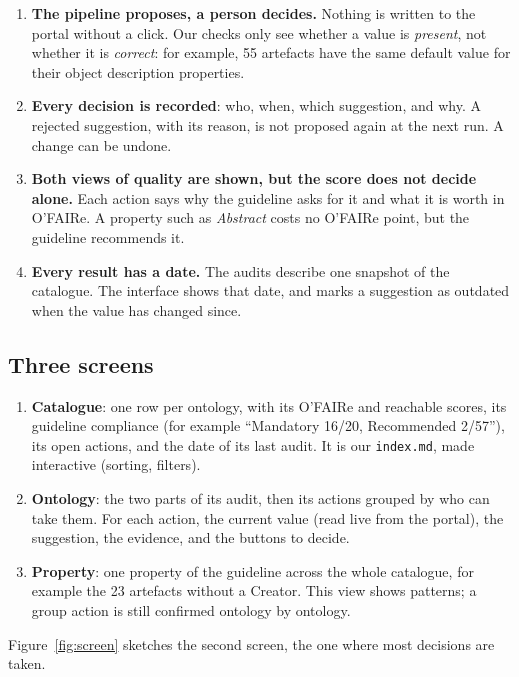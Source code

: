 \documentclass[11pt,a4paper]{article}
\begin{document}
\begin{enumerate}
  \item \textbf{The pipeline proposes, a person decides.} Nothing is written to the portal without a
    click. Our checks only see whether a value is \emph{present}, not whether it is \emph{correct}: for
    example, 55 artefacts have the same default value for their object description properties.
  \item \textbf{Every decision is recorded}: who, when, which suggestion, and why. A rejected
    suggestion, with its reason, is not proposed again at the next run. A change can be undone.
  \item \textbf{Both views of quality are shown, but the score does not decide alone.} Each action
    says why the guideline asks for it and what it is worth in O'FAIRe. A property such as \emph{Abstract}
    costs no O'FAIRe point, but the guideline recommends it.
  \item \textbf{Every result has a date.} The audits describe one snapshot of the catalogue. The
    interface shows that date, and marks a suggestion as outdated when the value has changed since.
\end{enumerate}

\subsection{Three screens}

\begin{enumerate}
  \item \textbf{Catalogue}: one row per ontology, with its O'FAIRe and reachable scores, its guideline
    compliance (for example ``Mandatory 16/20, Recommended 2/57''), its open actions, and the date of
    its last audit. It is our \texttt{index.md}, made interactive (sorting, filters).
  \item \textbf{Ontology}: the two parts of its audit, then its actions grouped by who can take them.
    For each action, the current value (read live from the portal), the suggestion, the evidence, and
    the buttons to decide.
  \item \textbf{Property}: one property of the guideline across the whole catalogue, for example the
    23 artefacts without a Creator. This view shows patterns; a group action is still confirmed
    ontology by ontology.
\end{enumerate}

Figure~\ref{fig:screen} sketches the second screen, the one where most decisions are taken.
\end{document}
